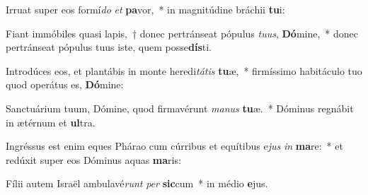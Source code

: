 \item Irruat super eos formí\textit{do} \textit{et} \textbf{pa}vor,~* in magnitúdine bráchii \textbf{tu}i:
\item Fiant immóbiles quasi lapis,~† donec pertránseat pópulus \textit{tu}\textit{us}, \textbf{Dó}mine,~* donec pertránseat pópulus tuus iste, quem posse\textbf{dís}ti.
\item Introdúces eos, et plantábis in monte heredi\textit{tá}\textit{tis} \textbf{tu}æ,~* firmíssimo habitáculo tuo quod operátus es, \textbf{Dó}mine:
\item Sanctuárium tuum, Dómine, quod firmavérunt \textit{ma}\textit{nus} \textbf{tu}æ.~* Dóminus regnábit in ætérnum et \textbf{ul}tra.
\item Ingréssus est enim eques Phárao cum cúrribus et equítibus e\textit{jus} \textit{in} \textbf{ma}re:~* et redúxit super eos Dóminus aquas \textbf{ma}ris:
\item Fílii autem Israël ambulavé\textit{runt} \textit{per} \textbf{sic}cum~* in médio \textbf{e}jus.
